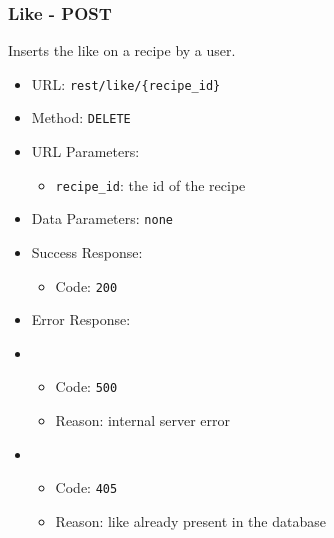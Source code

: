 \subsubsection*{Like - POST}
Inserts the like on a recipe by a user.
\begin{itemize}
    \item URL: \texttt{rest/like/\{recipe\_id\}}
    \item Method: \texttt{DELETE}
    \item URL Parameters:
    \begin{itemize}
        \item \texttt{recipe\_id}: the id of the recipe
    \end{itemize}
    \item Data Parameters: \texttt{none}
    \item Success Response:
    \begin{itemize}
        \item Code: \texttt{200}
    \end{itemize}
    \item Error Response:
    \item \begin{itemize}
                \item Code: \texttt{500}
                \item Reason: internal server error
                \end{itemize}
        \item \begin{itemize}
                \item Code: \texttt{405}
                \item Reason: like already present in the database
                \end{itemize}
    
\end{itemize}
